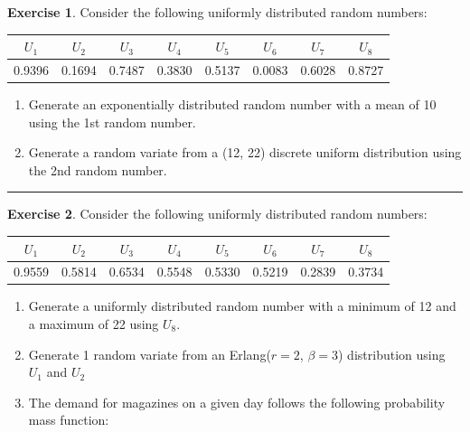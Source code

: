 \documentclass[
]{book}
\providecommand{\tightlist}{%
  \setlength{\itemsep}{0pt}\setlength{\parskip}{0pt}}
\theoremstyle{definition}
\theoremstyle{definition}
\theoremstyle{definition}
\newtheorem{exercise}{Exercise}[chapter]
\theoremstyle{definition}
\theoremstyle{remark}
\begin{document}
\begin{exercise}
\protect\hypertarget{exr:AppRNRVP9}{}{\label{exr:AppRNRVP9} }Consider the following uniformly distributed random numbers:
\end{exercise}

\begin{longtable}[]{@{}cccccccc@{}}
\toprule
\(U_1\) & \(U_2\) & \(U_3\) & \(U_4\) & \(U_5\) & \(U_6\) & \(U_7\) & \(U_8\) \\
\midrule
\endhead
0.9396 & 0.1694 & 0.7487 & 0.3830 & 0.5137 & 0.0083 & 0.6028 & 0.8727 \\
\bottomrule
\end{longtable}

\begin{enumerate}
\def\labelenumi{\alph{enumi}.}
\tightlist
\item
  Generate an exponentially distributed random number with a mean of 10
  using the 1st random number.
\item
  Generate a random variate from a (12, 22) discrete uniform distribution
  using the 2nd random number.
\end{enumerate}

\begin{center}\rule{0.5\linewidth}{0.5pt}\end{center}

\begin{exercise}
\protect\hypertarget{exr:AppRNRVP10}{}{\label{exr:AppRNRVP10} }Consider the following uniformly distributed random numbers:
\end{exercise}

\begin{longtable}[]{@{}cccccccc@{}}
\toprule
\(U_1\) & \(U_2\) & \(U_3\) & \(U_4\) & \(U_5\) & \(U_6\) & \(U_7\) & \(U_8\) \\
\midrule
\endhead
0.9559 & 0.5814 & 0.6534 & 0.5548 & 0.5330 & 0.5219 & 0.2839 & 0.3734 \\
\bottomrule
\end{longtable}

\begin{enumerate}
\def\labelenumi{\alph{enumi}.}
\tightlist
\item
  Generate a uniformly distributed random number with a minimum of 12 and
  a maximum of 22 using \(U_8\).
\item
  Generate 1 random variate from an Erlang(\(r=2\), \(\beta=3\)) distribution
  using \(U_1\) and \(U_2\)
\item
  The demand for magazines on a given day follows the following
  probability mass function:\\
\end{enumerate}
\end{document}
